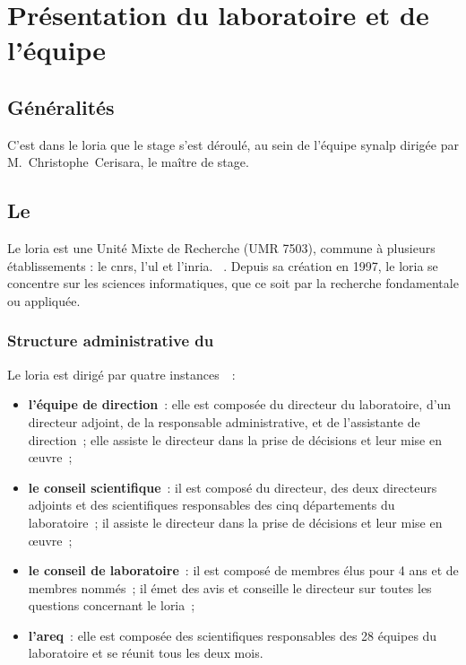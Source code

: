 \chapter{Présentation du laboratoire et de l'équipe}
\section{Généralités}
C'est dans le \gls{loria} que le stage s'est déroulé, au sein de l'équipe \gls{synalp} dirigée par M.~Christophe~Cerisara, le maître de stage.

\section{Le }
Le \gls{loria} \og est une Unité Mixte de Recherche (UMR 7503), commune à plusieurs établissements : le \gls{cnrs}, l’\gls{ul} et l'\gls{inria}. \fg{}~\autocite{about_loria}.
Depuis sa création en 1997, le \gls{loria} se concentre sur les sciences informatiques, que ce soit par la recherche fondamentale ou appliquée.

\subsection{Structure administrative du }
Le \gls{loria} est dirigé par quatre instances~\autocite{organisation_loria}~:
\begin{itemize}
	\item \textbf{l'équipe de direction}~: elle est composée du directeur du laboratoire, d'un directeur adjoint, de la responsable administrative, et de l'assistante de direction~; elle assiste le directeur dans la prise de décisions et leur mise en œuvre~;
	\item \textbf{le conseil scientifique}~: il est composé du directeur, des deux directeurs adjoints et des scientifiques responsables des cinq départements du laboratoire~; il assiste le directeur dans la prise de décisions et leur mise en œuvre~;
	\item \textbf{le conseil de laboratoire}~: il est composé de membres élus pour 4 ans et de membres nommés~; il émet des avis et conseille le directeur sur toutes les questions concernant le \gls{loria}~;
	\item \textbf{l'\gls{areq}}~: elle est composée des scientifiques responsables des 28 équipes du laboratoire et se réunit tous les deux mois.
\end{itemize}
\vspace{1em}

